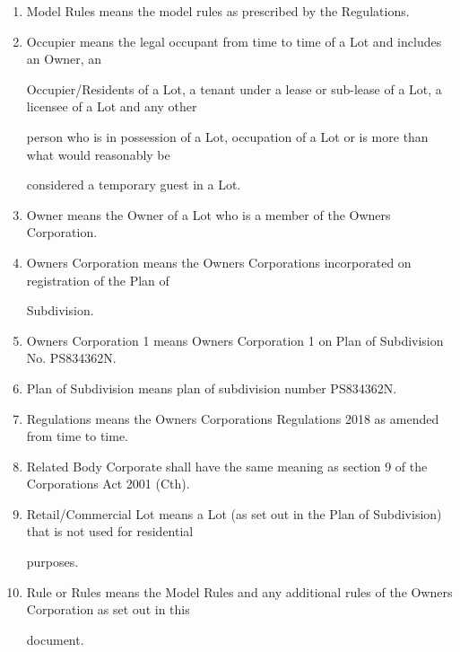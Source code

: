 \documentclass{article}
\begin{document}
\begin{enumerate}[label=\arabic*.]
\begin{enumerate}[label=\arabic{enumi}.\arabic*.]
\begin{enumerate}[label=(\arabic*)]
\item {\fontsize{9.962}{1} Model Rules means the model rules as prescribed by the Regulations. }

\item {\fontsize{9.962}{1} Occupier means the legal occupant from time to time of a Lot and includes an Owner, an }

{\fontsize{10.02}{1}Occupier/Residents of a Lot, a tenant under a lease or sub-lease of a Lot, a licensee of a Lot and any other }

{\fontsize{10.02}{1}person who is in possession of a Lot, occupation of a Lot or is more than what would reasonably be }

{\fontsize{10.02}{1}considered a temporary guest in a Lot. }

\item {\fontsize{9.962}{1} Owner means the Owner of a Lot who is a member of the Owners Corporation. }

\item {\fontsize{9.962}{1} Owners Corporation means the Owners Corporations incorporated on registration of the Plan of }

{\fontsize{10.02}{1}Subdivision. }

\item {\fontsize{9.962}{1} Owners Corporation 1 means Owners Corporation 1 on Plan of Subdivision No. PS834362N. }

\item {\fontsize{9.962}{1} Plan of Subdivision means plan of subdivision number PS834362N. }

\item {\fontsize{9.962}{1} Regulations means the Owners Corporations Regulations 2018 as amended from time to time. }

\item {\fontsize{9.962}{1} Related Body Corporate shall have the same meaning as section 9 of the Corporations Act 2001 (Cth). }

\item {\fontsize{9.962}{1} Retail/Commercial Lot means a Lot (as set out in the Plan of Subdivision) that is not used for residential }

{\fontsize{10.02}{1}purposes. }

\item {\fontsize{9.962}{1} Rule or Rules means the Model Rules and any additional rules of the Owners Corporation as set out in this }

{\fontsize{10.02}{1}document. }


\end{enumerate}
\end{enumerate}
\end{enumerate}
\end{document}
